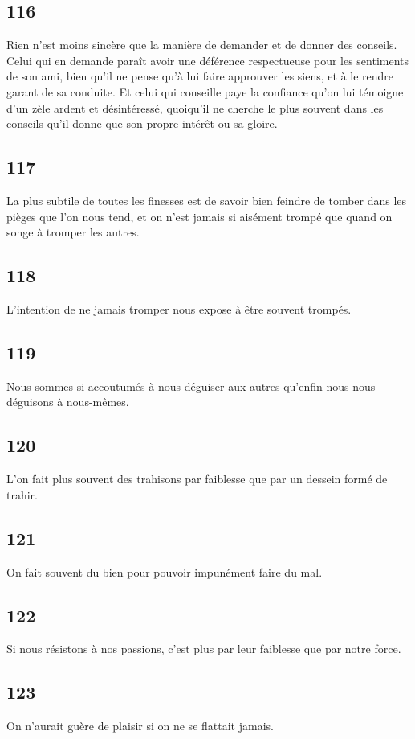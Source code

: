 \documentclass[french,twoside]{book} %
\begin{document}
\subsection[{116}]{ \textsc{116} }
\noindent Rien n’est moins sincère que la manière de demander et de donner des conseils. Celui qui en demande paraît avoir une déférence respectueuse pour les sentiments de son ami, bien qu’il ne pense qu’à lui faire approuver les siens, et à le rendre garant de sa conduite. Et celui qui conseille paye la confiance qu’on lui témoigne d’un zèle ardent et désintéressé, quoiqu’il ne cherche le plus souvent dans les conseils qu’il donne que son propre intérêt ou sa gloire.
\subsection[{117}]{ \textsc{117} }
\noindent La plus subtile de toutes les finesses est de savoir bien feindre de tomber dans les pièges que l’on nous tend, et on n’est jamais si aisément trompé que quand on songe à tromper les autres.
\subsection[{118}]{ \textsc{118} }
\noindent L’intention de ne jamais tromper nous expose à être souvent trompés.
\subsection[{119}]{ \textsc{119} }
\noindent Nous sommes si accoutumés à nous déguiser aux autres qu’enfin nous nous déguisons à nous-mêmes.
\subsection[{120}]{ \textsc{120} }
\noindent L’on fait plus souvent des trahisons par faiblesse que par un dessein formé de trahir.
\subsection[{121}]{ \textsc{121} }
\noindent On fait souvent du bien pour pouvoir impunément faire du mal.
\subsection[{122}]{ \textsc{122} }
\noindent Si nous résistons à nos passions, c’est plus par leur faiblesse que par notre force.
\subsection[{123}]{ \textsc{123} }
\noindent On n’aurait guère de plaisir si on ne se flattait jamais.
\end{document}
